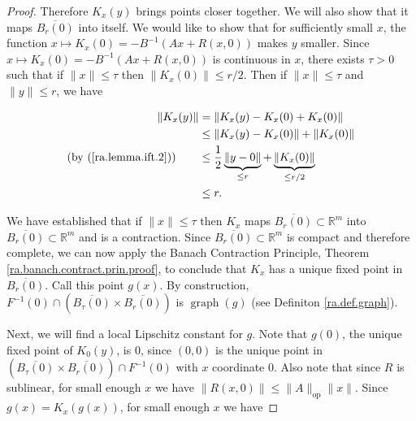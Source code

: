 \begin{proof}
Therefore \(K_x(y)\) brings points closer together. We will also show that it maps \(\overline{B_r(0)}\) into itself. We would like to show that for sufficiently small \(x\), the function \(x \mapsto K_x(0) = -B^{-1}(Ax + R(x,0))\) makes \(y\) smaller. Since \(x \mapsto K_x(0) = -B^{-1}(Ax + R(x,0))\) is continuous in \(x\), there exists \(\tau > 0\) such that if \(\lVert x \rVert \leq \tau\) then \(\lVert K_x(0) \rVert \leq r/2\). Then if \(\lVert x \rVert \leq \tau\) and \(\lVert y \rVert \leq r\), we have

\begin{align}
\lVert K_x(y) \rVert & = \lVert K_x(y) - K_x(0) + K_x(0) \rVert \nonumber 
\\ & \leq \lVert K_x(y) - K_x(0) \rVert + \lVert K_x(0) \rVert \nonumber
\\ \text{(by (\ref{ra.lemma.ift.2}))} \qquad & \leq \frac{1}{2} \underbrace{ \lVert y - 0 \rVert}_{\leq r} +  \underbrace{\lVert K_x(0) \rVert}_{\leq r/2} \nonumber
\\ & \leq r. \label{ra.lemma.ift.3}
\end{align}

We have established that if \(\lVert x \rVert \leq \tau\) then \(K_x\) maps \(\overline{B_r(0)} \subset \mathbb{R}^m\) into \(\overline{B_r(0)} \subset \mathbb{R}^m\) and is a contraction. Since \(\overline{B_r(0)} \subset \mathbb{R}^m\) is compact and therefore complete, we can now apply the Banach Contraction Principle, Theorem \ref{ra.banach.contract.prin.proof}, to conclude that \(K_x\) has a unique fixed point in \(\overline{B_r(0)}\). Call this point \(g(x)\). By construction, \(F^{-1}(0) \cap ( \overline{B_\tau(0)} \times \overline{B_r(0)})\) is \(\operatorname{graph}(g)\) (see Definiton \ref{ra.def.graph}).

Next, we will find a local Lipschitz constant for \(g\). Note that \(g(0)\), the unique fixed point of \(K_0(y)\), is 0, since \((0,0)\) is the unique point in \((\overline{B_\tau(0)} \times \overline{B_r(0)}) \cap F^{-1}(0)\) with \(x\) coordinate 0. Also note that since \(R\) is sublinear, for small enough \(x\) we have \(\lVert R(x,0) \rVert \leq \lVert A \rVert_{\text{op}} \lVert x \rVert\). Since \(g(x) = K_x(g(x))\), for small enough \(x\) we have


\end{proof}
